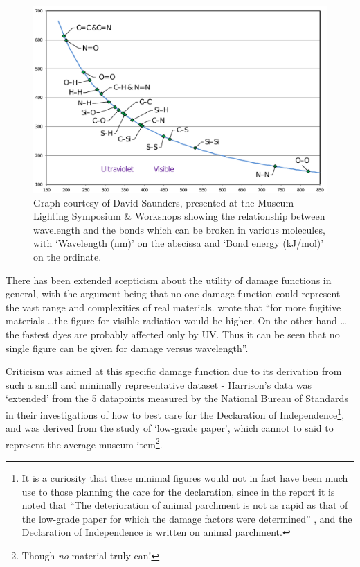 \begin{figure}[htbp]
\includegraphics[max width=\textwidth]{figs/LitRev/Saunders.pdf}
\caption{Graph courtesy of David Saunders, presented at the Museum Lighting Symposium \& Workshops \citep[p.61]{pokorska_book_2017} showing the relationship between wavelength and the bonds which can be broken in various molecules, with `Wavelength (nm)' on the abscissa and `Bond energy (kJ/mol)' on the ordinate.}
\label{fig:Saunders}
\end{figure}

There has been extended scepticism about the utility of damage functions in general, with the argument being that no one damage function could represent the vast range and complexities of real materials. \citet[p. 178]{thomson_museum_1978} wrote that ``for more fugitive materials \dots the figure for visible radiation would be higher. On the other hand \dots the fastest dyes are probably affected only by UV. Thus it can be seen that no single figure can be given for damage versus wavelength''.

Criticism was aimed at this specific damage function due to its derivation from such a small and minimally representative dataset - Harrison's data was `extended' from the 5 datapoints measured by the National Bureau of Standards \citep{national_bureau_of_standards_preservation_1951} in their investigations of how to best care for the Declaration of Independence\footnote{It is a curiosity that these minimal figures would not in fact have been much use to those planning the care for the declaration, since in the report it is noted that ``The deterioration of animal parchment is not as rapid as that of the low-grade paper for which the damage factors were determined'' \citep{national_bureau_of_standards_preservation_1951}, and the Declaration of Independence is written on animal parchment.}, and was derived from the study of `low-grade paper', which cannot to said to represent the average museum item\footnote{Though \emph{no} material truly can!}.

